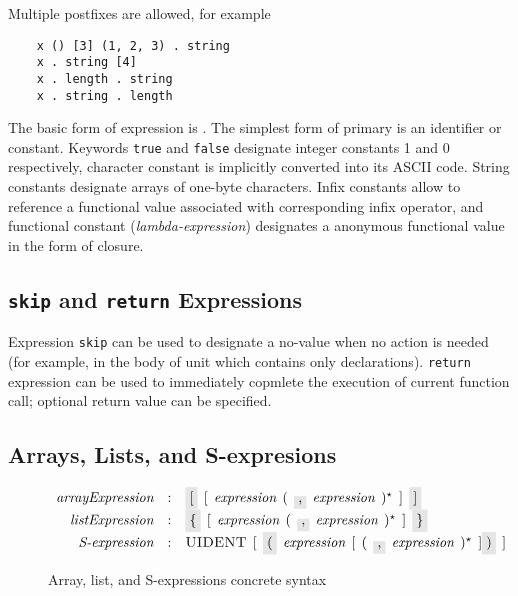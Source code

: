 Multiple postfixes are allowed, for example

\begin{lstlisting}
    x () [3] (1, 2, 3) . string
    x . string [4]
    x . length . string
    x . string . length
\end{lstlisting}

The basic form of expression is . The simplest form of primary is an identifier or constant. Keywords \lstinline|true| and \lstinline|false|
designate integer constants 1 and 0 respectively, character constant is implicitly converted into its ASCII code.  String constants designate arrays
of one-byte characters. Infix constants allow to reference a functional value associated with corresponding infix operator, and functional constant (\emph{lambda-expression})
designates a anonymous functional value in the form of closure.

\subsection{\lstinline|skip| and \lstinline|return| Expressions}

Expression \lstinline|skip| can be used to designate a no-value when no action is needed (for example, in the body of unit which contains only declarations).
\lstinline|return| expression can be used to immediately copmlete the execution of current function call; optional return value can be specified.

\subsection{Arrays, Lists, and S-expresions}

\begin{figure}[t]
  \[
    \begin{array}{rcl}
      \defterm{arrayExpression} & : & \term{[}\s[\s\nonterm{expression}\s(\s\term{,}\s\nonterm{expression}\s)^\star\s]\s\term{]}\\
      \defterm{listExpression}  & : & \term{\{}\s[\s\nonterm{expression}\s(\s\term{,}\s\nonterm{expression}\s)^\star\s]\s\term{\}}\\
      \defterm{S-expression}    & : & \token{UIDENT}\s[\s\term{(}\s\nonterm{expression}\s[\s(\s\term{,}\s\nonterm{expression}\s)^\star\s]\term{)}\s]
    \end{array}
  \]
  \caption{Array, list, and S-expressions concrete syntax}  
  \label{composite_expressions}
\end{figure}

